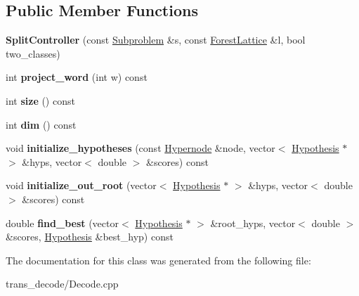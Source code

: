 \subsection*{Public Member Functions}
\begin{DoxyCompactItemize}
\item 
\hypertarget{classSplitController_a511e733b586a24c2cad5ba16a6cb381b}{
{\bfseries SplitController} (const \hyperlink{classSubproblem}{Subproblem} \&s, const \hyperlink{classForestLattice}{ForestLattice} \&l, bool two\_\-classes)}
\label{classSplitController_a511e733b586a24c2cad5ba16a6cb381b}

\item 
\hypertarget{classSplitController_ac01bf4220c60c35f6862160dc7fcacc7}{
int {\bfseries project\_\-word} (int w) const }
\label{classSplitController_ac01bf4220c60c35f6862160dc7fcacc7}

\item 
\hypertarget{classSplitController_a272757bbbfaa9af9d2ee2262b03ef131}{
int {\bfseries size} () const }
\label{classSplitController_a272757bbbfaa9af9d2ee2262b03ef131}

\item 
\hypertarget{classSplitController_ad2aeeafdc31d48526be15a1b1a2e9931}{
int {\bfseries dim} () const }
\label{classSplitController_ad2aeeafdc31d48526be15a1b1a2e9931}

\item 
\hypertarget{classSplitController_a6ac91d8fd5fef735c6572c420a05bda4}{
void {\bfseries initialize\_\-hypotheses} (const \hyperlink{classScarab_1_1HG_1_1Hypernode}{Hypernode} \&node, vector$<$ \hyperlink{structScarab_1_1HG_1_1Hypothesis}{Hypothesis} $\ast$ $>$ \&hyps, vector$<$ double $>$ \&scores) const }
\label{classSplitController_a6ac91d8fd5fef735c6572c420a05bda4}

\item 
\hypertarget{classSplitController_a58e535837326d733c98a193f2c7584c6}{
void {\bfseries initialize\_\-out\_\-root} (vector$<$ \hyperlink{structScarab_1_1HG_1_1Hypothesis}{Hypothesis} $\ast$ $>$ \&hyps, vector$<$ double $>$ \&scores) const }
\label{classSplitController_a58e535837326d733c98a193f2c7584c6}

\item 
\hypertarget{classSplitController_a2138b9bac43d19896f2bff71a619e9af}{
double {\bfseries find\_\-best} (vector$<$ \hyperlink{structScarab_1_1HG_1_1Hypothesis}{Hypothesis} $\ast$ $>$ \&root\_\-hyps, vector$<$ double $>$ \&scores, \hyperlink{structScarab_1_1HG_1_1Hypothesis}{Hypothesis} \&best\_\-hyp) const }
\label{classSplitController_a2138b9bac43d19896f2bff71a619e9af}

\end{DoxyCompactItemize}


The documentation for this class was generated from the following file:\begin{DoxyCompactItemize}
\item 
trans\_\-decode/Decode.cpp\end{DoxyCompactItemize}
